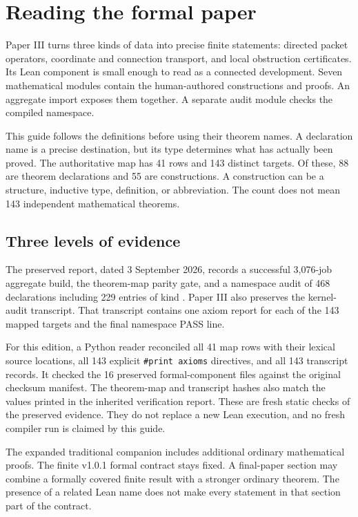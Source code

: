 \section{Reading the formal paper}
Paper III turns three kinds of data into precise finite statements: directed packet operators, coordinate and connection transport, and local obstruction certificates. Its Lean component is small enough to read as a connected development. Seven mathematical modules contain the human-authored constructions and proofs. An aggregate import exposes them together. A separate audit module checks the compiled namespace.

This guide follows the definitions before using their theorem names. A declaration name is a precise destination, but its type determines what has actually been proved. The authoritative map has 41 rows and 143 distinct targets. Of these, 88 are theorem declarations and 55 are constructions. A construction can be a structure, inductive type, definition, or abbreviation. The count does not mean 143 independent mathematical theorems.

\subsection{Three levels of evidence}
The preserved report, dated 3 September 2026, records a successful 3,076-job aggregate build, the theorem-map parity gate, and a namespace audit of 468 declarations including 229 entries of kind . Paper III also preserves the kernel-audit transcript. That transcript contains one axiom report for each of the 143 mapped targets and the final namespace PASS line.

For this edition, a Python reader reconciled all 41 map rows with their lexical source locations, all 143 explicit \texttt{\#print axioms} directives, and all 143 transcript records. It checked the 16 preserved formal-component files against the original checksum manifest. The theorem-map and transcript hashes also match the values printed in the inherited verification report. These are fresh static checks of the preserved evidence. They do not replace a new Lean execution, and no fresh compiler run is claimed by this guide.

The expanded traditional companion includes additional ordinary mathematical proofs. The finite v1.0.1 formal contract stays fixed. A final-paper section may combine a formally covered finite result with a stronger ordinary theorem. The presence of a related Lean name does not make every statement in that section part of the contract.

